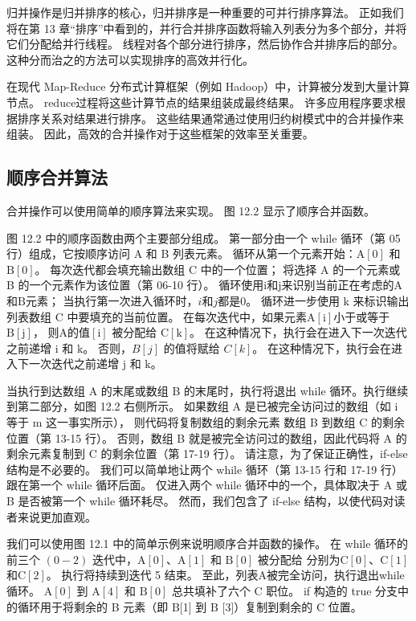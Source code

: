 归并操作是归并排序的核心，归并排序是一种重要的可并行排序算法。 
正如我们将在第 13 章“排序”中看到的，并行合并排序函数将输入列表分为多个部分，并将它们分配给并行线程。 
线程对各个部分进行排序，然后协作合并排序后的部分。 这种分而治之的方法可以实现排序的高效并行化。

在现代 Map-Reduce 分布式计算框架（例如 Hadoop）中，计算被分发到大量计算节点。 
reduce过程将这些计算节点的结果组装成最终结果。 许多应用程序要求根据排序关系对结果进行排序。 
这些结果通常通过使用归约树模式中的合并操作来组装。 因此，高效的合并操作对于这些框架的效率至关重要。

\subsection{顺序合并算法}
合并操作可以使用简单的顺序算法来实现。 图 12.2 显示了顺序合并函数。

图 12.2 中的顺序函数由两个主要部分组成。 第一部分由一个 while 循环（第 05 行）组成，它按顺序访问 A 和 B 列表元素。 
循环从第一个元素开始：$\mathrm{A}[0]$ 和 $\mathrm{B}[0]$。 
每次迭代都会填充输出数组 C 中的一个位置； 将选择 A 的一个元素或 B 的一个元素作为该位置（第 06-10 行）。 
循环使用$\mathrm{i}$和$\mathrm{j}$来识别当前正在考虑的A和$\mathrm{B}$元素； 当执行第一次进入循环时，$i$和$j$都是0。 
循环进一步使用 $\mathrm{k}$ 来标识输出列表数组 $\mathrm{C}$ 中要填充的当前位置。 
在每次迭代中，如果元素$\mathrm{A}[\mathrm{i}]$小于或等于$\mathrm{B}[\mathrm{j}]$，
则$\mathrm{A}的值 [\mathrm{i}]$ 被分配给 $\mathrm{C}[\mathrm{k}]$。 
在这种情况下，执行会在进入下一次迭代之前递增 $\mathrm{i}$ 和 $\mathrm{k}$。 
否则，$B[j]$ 的值将赋给 $C[k]$。 在这种情况下，执行会在进入下一次迭代之前递增 $\mathrm{j}$ 和 $\mathrm{k}$。

当执行到达数组 A 的末尾或数组 B 的末尾时，执行将退出 while 循环。执行继续到第二部分，如图 12.2 右侧所示。 
如果数组 $\mathrm{A}$ 是已被完全访问过的数组（如 $\mathrm{i}$ 等于 $\mathrm{m}$ 这一事实所示），
则代码将复制数组的剩余元素 数组 B 到数组 C 的剩余位置（第 13-15 行）。 
否则，数组 B 就是被完全访问过的数组，因此代码将 A 的剩余元素复制到 C 的剩余位置（第 17-19 行）。 
请注意，为了保证正确性，if-else 结构是不必要的。 
我们可以简单地让两个 while 循环（第 13-15 行和 17-19 行）跟在第一个 while 循环后面。 
仅进入两个 while 循环中的一个，具体取决于 A 或 B 是否被第一个 while 循环耗尽。 
然而，我们包含了 if-else 结构，以使代码对读者来说更加直观。

我们可以使用图 12.1 中的简单示例来说明顺序合并函数的操作。 
在 while 循环的前三个 $(0-2)$ 迭代中，$\mathrm{A}[0]、\mathrm{A}[1]$ 和 $\mathrm{B}[0]$ 被分配给 分别为$\mathrm{C}[0]、\mathrm{C}[1]$和$\mathrm{C}[2]$。 执行将持续到迭代 5 结束。 
至此，列表$\mathrm{A}$被完全访问，执行退出while循环。 
$\mathrm{A}[0]$ 到 $\mathrm{A}[4]$ 和 $\mathrm{B}[0]$ 总共填补了六个 $\mathrm{C}$ 职位。 
if 构造的 true 分支中的循环用于将剩余的 B 元素（即 B[1] 到 $\mathrm{B}$ [3]）复制到剩余的 $\mathrm{C}$ 位置。

